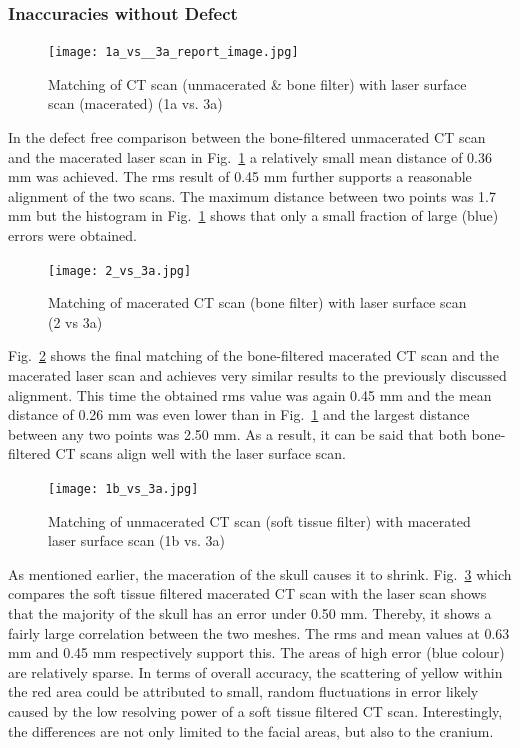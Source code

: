 \documentclass[a4paper]{article}
\begin{document}
\subsubsection{Inaccuracies without Defect} %

\begin {figure} [ht!]
\centering
\texttt{[image: 1a\_vs\_\_3a\_report\_image.jpg]}
\caption{\label{fig:1a_vs_3a}Matching of CT scan (unmacerated \& bone filter) with laser surface scan (macerated) (1a vs. 3a)}
\end{figure}

In the defect free comparison between the bone-filtered unmacerated CT scan and the macerated laser scan in Fig.~\ref{fig:1a_vs_3a} a relatively small mean distance of 0.36 mm was achieved. The rms result of 0.45 mm further supports a reasonable alignment of the two scans. The maximum distance between two points was 1.7 mm but the histogram in Fig.~\ref{fig:1a_vs_3a} shows that only a small fraction of large (blue) errors were obtained. 

\begin {figure} [ht!]
\centering
\texttt{[image: 2\_vs\_3a.jpg]}
\caption{\label{fig:2_vs_3a}Matching of macerated CT scan (bone filter) with laser surface scan (2 vs 3a)}
\end{figure}

Fig.~\ref{fig:2_vs_3a} shows the final matching of the bone-filtered macerated CT scan and the macerated laser scan and achieves very similar results to the previously discussed alignment. This time the obtained rms value was again 0.45 mm and the mean distance of 0.26 mm was even lower than in Fig.~\ref{fig:1a_vs_3a} and the largest distance between any two points was 2.50 mm. As a result, it can be said that both bone-filtered CT scans align well with the laser surface scan.

\begin {figure} [ht!]
\centering
\texttt{[image: 1b\_vs\_3a.jpg]}
\caption{\label{fig:1b_vs_3a}Matching of unmacerated CT scan (soft tissue filter) with macerated laser surface scan (1b vs. 3a)}
\end{figure}

As mentioned earlier, the maceration of the skull causes it to shrink. Fig.~\ref{fig:1b_vs_3a} which compares the soft tissue filtered macerated CT scan with the laser scan shows that the majority of the skull has an error under 0.50 mm. Thereby, it shows a fairly large correlation between the two meshes. The rms and mean values at 0.63 mm and 0.45 mm respectively support this. The areas of high error (blue colour) are relatively sparse. In terms of overall accuracy, the scattering of yellow within the red area could be attributed to small, random fluctuations in error likely caused by the low resolving power of a soft tissue filtered CT scan. Interestingly, the differences are not only limited to the facial areas, but also to the cranium.
\end{document}
